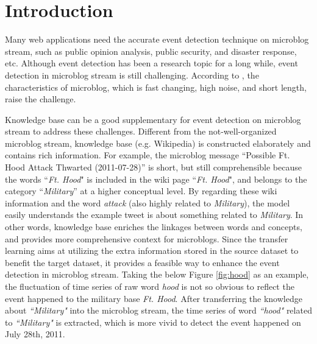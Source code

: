 \documentclass[runningheads,a4paper]{llncs}
\theoremstyle{exampstyle}
\begin{document}
\section{Introduction}
Many web applications need the accurate event detection technique on microblog stream, such as public opinion analysis\cite{thelwall2011sentiment}, public security\cite{Li:2012gw}, and disaster response\cite{Yin:2012ht}, etc.
Although event detection has been a research topic for a long while\cite{allan1998topic}, event detection in microblog stream is still challenging\cite{atefeh2015survey}.
According to \cite{huang2016probabilistic}, the characteristics of microblog, which is fast changing, high noise, and short length, raise the challenge.

Knowledge base can be a good supplementary for event detection on microblog stream to address these challenges.
Different from the not-well-organized microblog stream, knowledge base (e.g. Wikipedia) is constructed elaborately and contains rich information. 
For example, the microblog message ``Possible Ft. Hood Attack Thwarted (2011-07-28)'' is short, but still comprehensible because the words ``\textit{Ft. Hood}" is included in the wiki page ``\textit{Ft. Hood}", and belongs to the category ``\textit{Military}'' at a higher conceptual level.
By regarding these wiki information and the word \textit{attack} (also highly related to \textit{Military}), the model easily understands the example tweet is about something related to \textit{Military}.
In other words, knowledge base enriches the linkages between words and concepts, and provides more comprehensive context for microblogs.
Since the transfer learning\cite{pan2010survey} aims at utilizing the extra information stored in the source dataset to benefit the target dataset, it provides a feasible way to enhance the event detection in microblog stream.
Taking the below Figure \ref{fig:hood} as an example, the fluctuation of time series of raw word \textit{hood} is not so obvious to reflect the event happened to the military base \textit{Ft. Hood}.
After transferring the knowledge about \textit{``Military"} into the microblog stream, the time series of word \textit{``hood"} related to \textit{``Military"} is extracted, which is more vivid to detect the event happened on July 28th, 2011.
\end{document}

